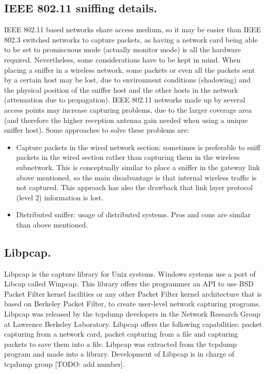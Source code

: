 \documentclass[thesis=M,english]{FITthesis}[2011/07/15]
\begin{document}
\subsection{IEEE 802.11 sniffing details.}
IEEE 802.11 based networks share access medium, so it may be easier than IEEE 802.3 switched networks to capture packets, as having a network card being able to be set to promiscuous mode (actually monitor mode) is all the hardware required.
Nevertheless, some considerations have to be kept in mind. When placing a sniffer in a wireless network, some packets or even all the packets sent by a certain host may be lost, due to environment conditions (shadowing) and the physical position of the sniffer host and the other hosts in the network (attenuation due to propagation). IEEE 802.11 networks made up by several access points may increase capturing problems, due to the larger coverage area (and therefore the higher reception antenna gain needed when using a unique sniffer host).
Some approaches to solve these problems are:
\begin{itemize}
\item Capture packets in the wired network section: sometimes is preferable to sniff packets in the wired section rather than capturing them in the wireless subnetwork. This is conceptually similar to place a sniffer in the gateway link above mentioned, so the main disadvantage is that internal wireless traffic is not captured. This approach has also the drawback that link layer protocol (level 2) information is lost.
\item Distributed sniffer: usage of distributed systems. Pros and cons are similar than above mentioned.
\end{itemize}

\subsection{Libpcap.}
Libpcap is the capture library for Unix systems. Windows systems use a port of Libcap called Winpcap. This library offers the programmer an API to use BSD Packet Filter kernel facilities or any other Packet Filter kernel architecture that is based on Berkeley Packet Filter, to create user-level network capturing programs. Libpcap was released by the tcpdump developers in the Network Research Group at Lawrence Berkeley Laboratory. Libpcap offers the following capabilities: packet capturing from a network card, packet capturing from a file and capturing packets to save them into a file. Libpcap was extracted from the tcpdump program and made into a library. Development of Libpcap is in charge of tcpdump group [TODO: add number].
\end{document}
